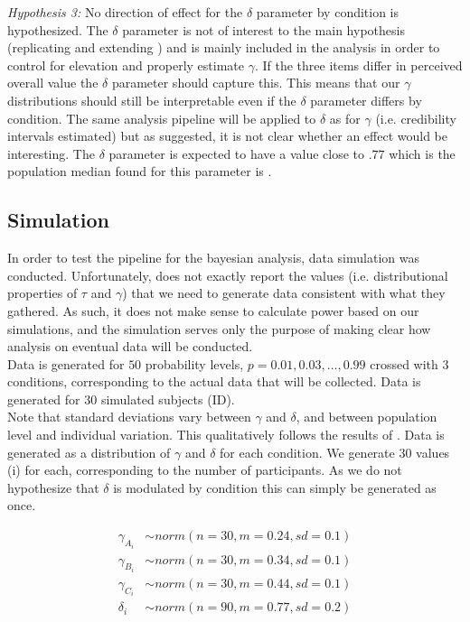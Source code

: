 \documentclass[12pt]{article}
\begin{document}
\emph{Hypothesis 3:} No direction of effect
for the $\delta$ parameter by condition is
hypothesized. The  $\delta$ parameter is
not of interest to the main hypothesis
(replicating and extending \textcite{rottenstreich2001money})
and is mainly included in the analysis in
order to control for elevation and properly
estimate  $\gamma$. If the three items differ
in perceived overall value the $\delta$ parameter
should capture this. This means that our $\gamma$
distributions should still be interpretable
even if the $\delta$ parameter differs by
condition. The same analysis pipeline will be applied
to $\delta$ as for $\gamma$ (i.e. credibility
intervals estimated) but as suggested,
it is not clear whether an effect would
be interesting. The $\delta$ parameter is
expected to have a value close to $.77$
which is the population median found for
this parameter is \textcite{gonzalez1999shape}.

\subsection{Simulation}

In order to test the pipeline for the
bayesian analysis, data simulation was
conducted. Unfortunately, \textcite{gonzalez1999shape}
does not exactly report the values (i.e.
distributional properties of $\tau$ and
$\gamma$) that we need
to generate data consistent with what they
gathered. As such, it does not make sense
to calculate power based on our simulations,
and the simulation serves only the purpose
of making clear how analysis on eventual data
will be conducted. \\

Data is generated for $50$ probability levels,
$p = 0.01, 0.03,  \ldots, 0.99$ crossed with $3$
conditions, corresponding to the actual data
that will be collected.
Data is generated for $30$ simulated subjects (ID). \\

Note that standard deviations vary
between $\gamma$ and $\delta$, and
between population level and individual
variation. This qualitatively
follows the results of \textcite{gonzalez1999shape}.
Data is generated as a distribution of $\gamma$
and $\delta$ for each condition. We generate
$30$ values (i) for each, corresponding to the
number of participants. As we do not hypothesize
that $\delta$ is modulated by condition
this can simply be generated as once.


\begin{equation} \label{eq1}
\begin{split}
	\gamma_{A_{i}} &\sim norm(n = 30,
	m = 0.24, sd = 0.1) \\
	\gamma_{B_{i}} &\sim norm(n = 30,
	m = 0.34, sd = 0.1) \\
	\gamma_{C_{i}} &\sim norm(n = 30,
	m = 0.44, sd = 0.1) \\
	\delta_i &\sim norm(n = 90,
	m = 0.77, sd = 0.2)
\end{split}
\end{equation}
\end{document}
